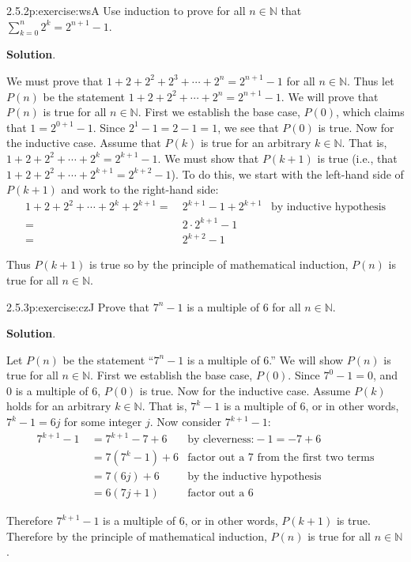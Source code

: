 \documentclass[twoside,11pt,]{book}
\newcommand{\blocktitlefont}{\relax}
\numberwithin{equation}{chapter}
\renewcommand{\d}{\displaystyle}
\newcommand{\N}{\mathbb N}
\newcommand{\amp}{&}
\begin{document}
\begin{divisionsolution}{2.5.2}{}{p:exercise:wsA}%
Use induction to prove for all \(n \in \N\) that \(\d\sum_{k=0}^n 2^k = 2^{n+1} - 1\).%
\par\smallskip%
\noindent\textbf{\blocktitlefont Solution}.\quad{}\begin{solutionproof}
We must prove that \(1 + 2 + 2^2 + 2^3 + \cdots +2^n = 2^{n+1} - 1\) for all \(n \in \N\). Thus let \(P(n)\) be the statement \(1 + 2 + 2^2 + \cdots + 2^n = 2^{n+1} - 1\). We will prove that \(P(n)\) is true for all \(n \in \N\). First we establish the base case, \(P(0)\), which claims that \(1 = 2^{0+1} -1\). Since \(2^1 - 1 = 2 - 1 = 1\), we see that \(P(0)\) is true. Now for the inductive case. Assume that \(P(k)\) is true for an arbitrary \(k \in \N\). That is, \(1 + 2 + 2^2 + \cdots + 2^k = 2^{k+1} - 1\). We must show that \(P(k+1)\) is true (i.e., that \(1 + 2 + 2^2 + \cdots + 2^{k+1} = 2^{k+2} - 1\)). To do this, we start with the left-hand side of \(P(k+1)\) and work to the right-hand side:%
\begin{align*}
1 + 2 + 2^2 + \cdots + 2^k + 2^{k+1} = \amp ~ 2^{k+1} - 1 + 2^{k+1} \amp \text{by inductive hypothesis}\\
= \amp ~2\cdot 2^{k+1} - 1 \amp\\
= \amp ~ 2^{k+2} - 1 \amp
\end{align*}
%
\par
Thus \(P(k+1)\) is true so by the principle of mathematical induction, \(P(n)\) is true for all \(n \in \N\).%
\end{solutionproof}
\end{divisionsolution}%
\begin{divisionsolution}{2.5.3}{}{p:exercise:czJ}%
Prove that \(7^n - 1\) is a multiple of 6 for all \(n \in \N\).%
\par\smallskip%
\noindent\textbf{\blocktitlefont Solution}.\quad{}\begin{solutionproof}
Let \(P(n)\) be the statement ``\(7^n - 1\) is a multiple of 6.'' We will show \(P(n)\) is true for all \(n \in \N\). First we establish the base case, \(P(0)\). Since \(7^0 - 1 = 0\), and \(0\) is a multiple of 6, \(P(0)\) is true. Now for the inductive case. Assume \(P(k)\) holds for an arbitrary \(k \in \N\). That is, \(7^k - 1\) is a multiple of 6, or in other words, \(7^k - 1 = 6j\) for some integer \(j\). Now consider \(7^{k+1} - 1\):%
\begin{align*}
7^{k+1} - 1 ~ \amp = 7^{k+1} - 7 + 6 \amp \text{by cleverness:} -1 = -7 + 6\\
\amp = 7(7^k - 1) + 6 \amp \text{factor out a 7 from the first two terms}\\
\amp = 7(6j) + 6 \amp \text{by the inductive hypothesis}\\
\amp = 6(7j + 1) \amp \text{factor out a 6}
\end{align*}
%
\par
Therefore \(7^{k+1} - 1\) is a multiple of 6, or in other words, \(P(k+1)\) is true. Therefore by the principle of mathematical induction, \(P(n)\) is true for all \(n \in \N\).%
\end{solutionproof}
\end{divisionsolution}%
\end{document}

